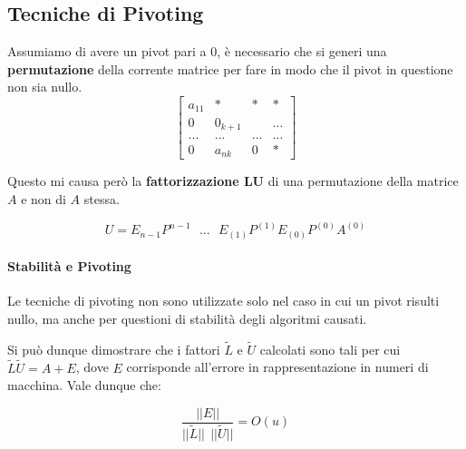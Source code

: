 \documentclass{article}
\begin{document}
\subsection{Tecniche di Pivoting}

Assumiamo di avere un pivot pari a $0$, è necessario che si generi una \textbf{permutazione}
della corrente matrice per fare in modo che il pivot in questione non sia nullo.
\[
    \begin{bmatrix}
    a_{11} & * & *  & * \\
    0 & 0_{k+1} &  & ...\\
     ...& ... & ... &  ...\\
     0 & a_{nk} & 0 & *
    \end{bmatrix}
\]

Questo mi causa però la \textbf{fattorizzazione LU} di una permutazione della matrice
$A$ e non di $A$ stessa.

\[ U = E_{n-1}P^{n-1} \:\:\: ... \:\:\: E_{(1)}P^{(1)}E_{(0)}P^{(0)}A^{(0)} \]

\paragraph{Stabilità e Pivoting} Le tecniche di pivoting non sono utilizzate solo
nel caso in cui un pivot risulti nullo, ma anche per questioni di stabilità degli
algoritmi causati.

Si può dunque dimostrare che i fattori $\tilde{L}$ e $\tilde{U}$ calcolati sono tali
per cui $\tilde{L} \tilde{U} = A + E $, dove $E$ corrisponde all'errore in rappresentazione
in numeri di macchina.
Vale dunque che:

\[ \frac{||E||}{||\tilde{L}||\:\: ||\tilde{U}||} = O(u) \]
\newpage
\end{document}

